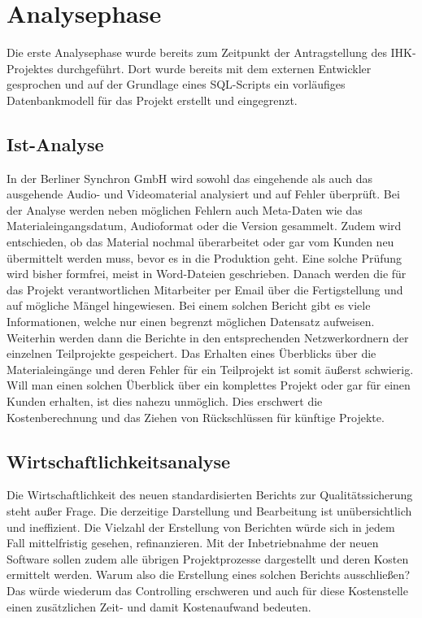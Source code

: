 \section{Analysephase} 
\label{sec:Analysephase}
Die erste Analysephase wurde bereits zum Zeitpunkt der Antragstellung des IHK-Projektes durchgeführt. Dort wurde bereits mit dem externen Entwickler gesprochen und auf der Grundlage eines SQL-Scripts ein vorläufiges Datenbankmodell für das Projekt erstellt und eingegrenzt.

\subsection{Ist-Analyse} 
\label{sec:IstAnalyse}
In der Berliner Synchron GmbH wird sowohl das eingehende als auch das ausgehende Audio- und Videomaterial analysiert und auf Fehler überprüft. Bei der Analyse werden neben möglichen Fehlern auch Meta-Daten wie das Materialeingangsdatum, Audioformat oder die Version gesammelt. Zudem wird entschieden, ob das Material nochmal überarbeitet oder gar vom Kunden neu übermittelt werden muss, bevor es in die Produktion geht. Eine solche Prüfung wird bisher formfrei, meist in Word-Dateien geschrieben. Danach werden die für das Projekt verantwortlichen Mitarbeiter per Email über die Fertigstellung und auf mögliche Mängel hingewiesen. Bei einem solchen Bericht gibt es viele Informationen, welche nur einen begrenzt möglichen Datensatz aufweisen. Weiterhin werden dann die Berichte in den entsprechenden Netzwerkordnern der einzelnen Teilprojekte gespeichert. Das Erhalten eines Überblicks über die Materialeingänge und deren Fehler für ein Teilprojekt ist somit äußerst schwierig. Will man einen solchen Überblick über ein komplettes Projekt oder gar für einen Kunden erhalten, ist dies nahezu unmöglich. Dies erschwert die Kostenberechnung und das Ziehen von Rückschlüssen für künftige Projekte.

\subsection{Wirtschaftlichkeitsanalyse}
\label{sec:Wirtschaftlichkeitsanalyse}
Die Wirtschaftlichkeit des neuen standardisierten Berichts zur Qualitätssicherung steht außer Frage. Die derzeitige Darstellung und Bearbeitung ist unübersichtlich und ineffizient. Die Vielzahl der Erstellung von Berichten würde sich in jedem Fall mittelfristig gesehen, refinanzieren. Mit der Inbetriebnahme der neuen Software sollen zudem alle übrigen Projektprozesse dargestellt und deren Kosten ermittelt werden. Warum also die Erstellung eines solchen Berichts ausschließen? Das würde wiederum das Controlling erschweren und auch für diese Kostenstelle einen zusätzlichen Zeit- und damit Kostenaufwand bedeuten.

